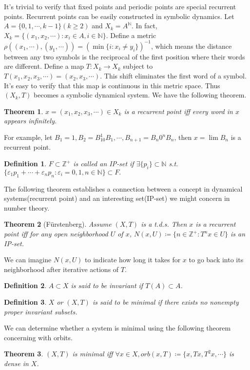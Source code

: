 \documentclass[12pt]{article}
\newtheorem{definition}{Definition}
\newtheorem{theorem}{Theorem}
\begin{document}
It's trivial to verify that fixed points and periodic points are special recurrent points. Recurrent points can be easily constructed in symbolic dynamics. Let $A=\{0,1,\cdots,k-1 \}(k\ge 2) $ and $X_k=A^{\mathbb{N}} $. In fact, $X_k=\{(x_1,x_2,\cdots):x_i\in A,i\in\mathbb{N} \} $. Define a metric $\rho ((x_1,\cdots),(y_1,\cdots))=(\min\{i:x_i\ne y_i \})^{-1} $, which means the distance between any two symbols is the reciprocal of the first position where their words are different. Define a map $T:X_k\to X_k $ subject to $T(x_1,x_2,x_3,\cdots)=(x_2,x_3,\cdots) $. This shift eliminates the first word of a symbol. It's easy to verify that this map is continuous in this metric space. Thus $(X_k, T) $ becomes a symbolic dynamical system. We have the following theorem.
\begin{theorem}
$x=(x_1,x_2,x_3,\cdots)\in X_k $ is a recurrent point iff every word in $x$ appears infinitely.
\end{theorem}
For example, let $B_1=1,B_2=B_10^1B_1,\cdots,B_{n+1}=B_n0^nB_n $, then $x=\lim B_n $ is a recurrent point.
\begin{definition}
$F\subset\mathbb{Z}^+ $ is called an IP-set if $\exists\{p_i\}\subset \mathbb{N} $ s.t. $\{\varepsilon_1p_1+\cdots+\varepsilon_np_n:\varepsilon_i=0,1,n\in\mathbb{N} \}\subset F . $
\end{definition}
The following theorem establishes a connection between a concept in dynamical systems(recurrent point) and an interesting set(IP-set) we might concern in number theory.
\begin{theorem}[F\"urstenberg]
Assume $(X,T) $ is a t.d.s. Then $x$ is a recurrent point iff for any open neighborhood $U$ of $x$, $N(x,U)\coloneqq \{n\in\mathbb{Z}^+:T^nx\in U \} $ is an IP-set.
\end{theorem}
We can imagine $N(x,U)$ to indicate how long it takes for $x$ to go back into its neighborhood after iterative actions of $T$.
\begin{definition}
$A\subset X $ is said to be invariant if $T(A)\subset A $. 
\end{definition}
\begin{definition}
$X$ or $(X,T)$ is said to be minimal if there exists no nonempty proper invariant subsets.
\end{definition}
We can determine whether a system is minimal using the following theorem concerning with orbits.
\begin{theorem}
$(X,T)$ is minimal iff $\forall x\in X, orb(x,T)\coloneqq \{x,Tx,T^2x,\cdots \} $ is dense in $X$.
\end{theorem}
\end{document}
